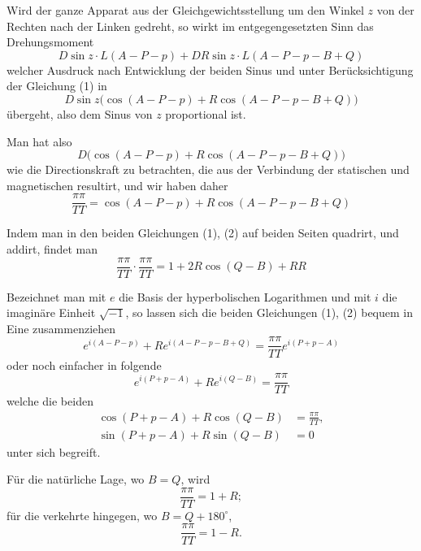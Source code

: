 \documentclass[12pt,a4paper]{article}
\begin{document}
Wird der ganze Apparat aus der Gleichgewichtsstellung um den Winkel $z$ von der Rechten nach der Linken gedreht, so wirkt im entgegengesetzten Sinn das Drehungsmoment
\begin{equation*}
D\sin z \cdot L(A - P - p) + DR\sin z \cdot L(A - P - p - B + Q)
\end{equation*}
welcher Ausdruck nach Entwicklung der beiden Sinus und unter Berücksichtigung der Gleichung (1) in
\begin{equation*}
D\sin z\bigl(\cos(A - P - p) + R\cos(A - P - p - B + Q)\bigr)
\end{equation*}
übergeht, also dem Sinus von $z$ proportional ist.

Man hat also
\begin{equation}
D\bigl(\cos(A - P - p) + R\cos(A - P - p - B + Q)\bigr)
\end{equation}
wie die Directionskraft zu betrachten, die aus der Verbindung der statischen und magnetischen resultirt, und wir haben daher
\begin{equation}
\frac{\pi\pi}{TT} = \cos(A - P - p) + R\cos(A - P - p - B + Q)
\end{equation}

Indem man in den beiden Gleichungen (1), (2) auf beiden Seiten quadrirt, und addirt, findet man
\begin{equation}
\frac{\pi\pi}{TT}\cdot\frac{\pi\pi}{TT} = 1 + 2R\cos(Q - B) + RR
\end{equation}

Bezeichnet man mit $e$ die Basis der hyperbolischen Logarithmen und mit $i$ die imaginäre Einheit $\sqrt{-1}$, so lassen sich die beiden Gleichungen (1), (2) bequem in Eine zusammenziehen
\begin{equation*}
e^{i(A-P-p)} + Re^{i(A-P-p-B+Q)} = \frac{\pi\pi}{TT}e^{i(P+p-A)}
\end{equation*}
oder noch einfacher in folgende
\begin{equation}
e^{i(P+p-A)} + Re^{i(Q-B)} = \frac{\pi\pi}{TT}
\end{equation}
welche die beiden
\begin{align}
\cos(P + p - A) + R\cos(Q - B) &= \frac{\pi\pi}{TT},\\
\sin(P + p - A) + R\sin(Q - B) &= 0
\end{align}
unter sich begreift.

Für die natürliche Lage, wo $B = Q$, wird
\begin{equation}
\frac{\pi\pi}{TT} = 1 + R;
\end{equation}
für die verkehrte hingegen, wo $B = Q + 180^{\circ}$,
\begin{equation}
\frac{\pi\pi}{TT} = 1 - R.
\end{equation}
\end{document}
